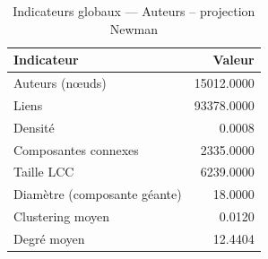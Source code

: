 \begin{table}
\caption{Indicateurs globaux — Auteurs – projection Newman}
\label{tab:global_result_auteur_newman}
\begin{tabular}{lr}
\toprule
Indicateur & Valeur \\
\midrule
Auteurs (nœuds) & 15012.0000 \\
Liens & 93378.0000 \\
Densité & 0.0008 \\
Composantes connexes & 2335.0000 \\
Taille LCC & 6239.0000 \\
Diamètre (composante géante) & 18.0000 \\
Clustering moyen & 0.0120 \\
Degré moyen & 12.4404 \\
\bottomrule
\end{tabular}
\end{table}
